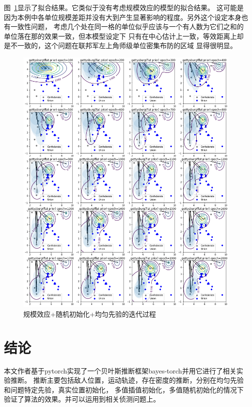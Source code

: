 \documentclass{article}
\begin{document}
图~\ref{fig:gettysburgInitTwo}显示了拟合结果。它类似于没有考虑规模效应的模型的拟合结果。
这可能是因为本例中各单位规模差距并没有大到产生显著影响的程度。另外这个设定本身也有一致性问题，
考虑几个处在同一格的单位似乎应该与一个有人数为它们之和的单位落在那的效果一致，但本模型设定下
只有在中心估计上一致，等效距离上却是不一致的，这个问题在联邦军左上角师级单位密集布防的区域
显得很明显。

\begin{figure}[ht]
\includegraphics[width=0.99\linewidth]{gettysburg-init2.png}
\caption{
规模效应+随机初始化+均匀先验的迭代过程}
\label{fig:gettysburgInitTwo}
\end{figure}


\section{结论}

本文作者基于pytorch实现了一个贝叶斯推断框架bayes-torch并用它进行了相关实验推断。
推断主要包括敌人位置，运动轨迹，存在密度的推断，分别在均匀先验和问题特定先验，真实位置初始化，
多值插值初始化，多值随机初始化的情况下验证了算法的效果。并可以运用到相关侦测问题上。
\end{document}
